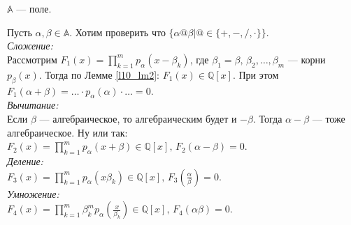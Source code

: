 \begin{theorem} \label{l10_th1}
	$\mathbb{A}$ — поле.
\end{theorem}
\begin{pf}
	Пусть $\alpha, \beta \in \mathbb{A}$. Хотим проверить что $\{ \alpha @ \beta \vert @ \in \{+, -, /, \cdot \} \}$.\\
	\textit{Сложение:}\\
	Рассмотрим $\displaystyle F_1(x) = \prod\limits_{k=1}^m p_\alpha\left( x-\beta_k \right)$, где $\beta_1 = \beta, \, \beta_2,\dots,\beta_m$ — корни $p_\beta(x)$. Тогда по Лемме \ref{l10_lm2}: $F_1(x) \in \mathbb{Q}[x]$. При этом $\displaystyle F_1(\alpha + \beta) = \dots \cdot p_\alpha(\alpha) \cdot \dots = 0$.\\
	\textit{Вычитание:}\\
Если $\beta$ — алгебраическое, то алгебраическим будет и $-\beta$. Тогда $\alpha-\beta$ — тоже алгебраическое. Ну или так: $\displaystyle F_2(x) = \prod\limits_{k=1}^m p_\alpha \left( x+\beta \right) \in \mathbb{Q}[x], \, F_2(\alpha-\beta)=0$.\\
	\textit{Деление:}\\
	$\displaystyle F_3(x) = \prod\limits_{k=1}^m p_\alpha\left( x\beta_k \right) \in \mathbb{Q}[x], \, F_3\left( \frac{\alpha}{\beta} \right) = 0$.\\
	\textit{Умножение:}\\
	$\displaystyle F_4(x) = \prod\limits_{k=1}^m \beta_k^m p_\alpha\left( \frac{x}{\beta_k} \right) \in \mathbb{Q}[x], \, F_4\left( \alpha\beta \right) = 0$.
\end{pf}